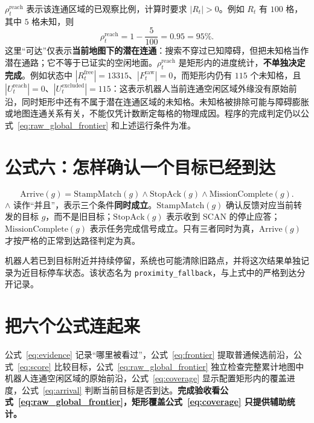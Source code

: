 \documentclass[UTF8,12pt,a4paper]{ctexart}
\begin{document}
$\rho_t^{\mathrm{reach}}$ 表示该连通区域的已观察比例，计算时要求 $|R_t|>0$。例如 $R_t$ 有 $100$ 格，其中 $5$ 格未知，则
\[
\rho_t^{\mathrm{reach}}=1-\frac{5}{100}=0.95=95\%.
\]
这里“可达”仅表示\textbf{当前地图下的潜在连通}：搜索不穿过已知障碍，但把未知格当作潜在通路；它不等于已证实的空闲地面。$\rho_t^{\mathrm{reach}}$ 是矩形内的进度统计，\textbf{不单独决定完成}。例如状态中 $|R_t^{\mathrm{free}}|=13315$、$|F_t^{\mathrm{raw}}|=0$，而矩形内仍有 $115$ 个未知格，且 $|U_t^{\mathrm{reach}}|=0$、$|U_t^{\mathrm{excluded}}|=115$：这表示机器人当前连通空闲区域外缘没有原始前沿，同时矩形中还有不属于潜在连通区域的未知格。未知格被排除可能与障碍膨胀或地图连通关系有关，不能仅凭计数断定每格的物理成因。程序的完成判定仍以公式~\eqref{eq:raw_global_frontier} 和上述运行条件为准。

\section{公式六：怎样确认一个目标已经到达}
\begin{equation}\label{eq:arrival}
\mathrm{Arrive}(g)=
\mathrm{StampMatch}(g)\land
\mathrm{StopAck}(g)\land
\mathrm{MissionComplete}(g).
\end{equation}
$\land$ 读作“并且”，表示三个条件\textbf{同时成立}。$\mathrm{StampMatch}(g)$ 确认反馈对应当前转发的目标 $g$，而不是旧目标；$\mathrm{StopAck}(g)$ 表示收到 SCAN 的停止应答；$\mathrm{MissionComplete}(g)$ 表示任务完成信号成立。只有三者同时为真，$\mathrm{Arrive}(g)$ 才按严格的正常到达路径判定为真。

机器人若已到目标附近并持续停留，系统也可能清除旧路点，并将这次结果单独记录为近目标停车状态。该状态名为 \texttt{proximity\_fallback}，与上式中的严格到达分开记录。

\section*{把六个公式连起来}
公式~\eqref{eq:evidence} 记录“哪里被看过”，公式~\eqref{eq:frontier} 提取普通候选前沿，公式~\eqref{eq:score} 比较目标，公式~\eqref{eq:raw_global_frontier} 独立检查完整累计地图中机器人连通空闲区域的原始前沿，公式~\eqref{eq:coverage} 显示配置矩形内的覆盖进度，公式~\eqref{eq:arrival} 判断当前目标是否到达。\textbf{完成验收看公式~\eqref{eq:raw_global_frontier}，矩形覆盖公式~\eqref{eq:coverage} 只提供辅助统计。}
\end{document}
